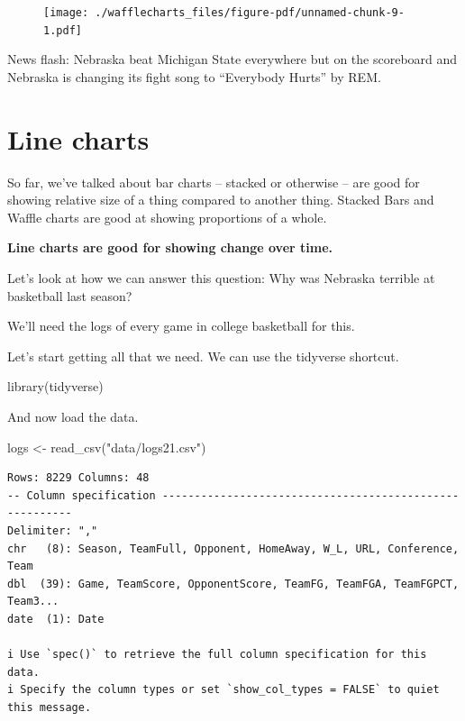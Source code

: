 \documentclass[
  letterpaper,
  DIV=11,
  numbers=noendperiod]{scrreprt}
\newenvironment{Shaded}{\begin{snugshade}}{\end{snugshade}}
\newcommand{\FunctionTok}[1]{\textcolor[rgb]{0.28,0.35,0.67}{#1}}
\newcommand{\NormalTok}[1]{\textcolor[rgb]{0.00,0.23,0.31}{#1}}
\newcommand{\OtherTok}[1]{\textcolor[rgb]{0.00,0.23,0.31}{#1}}
\newcommand{\StringTok}[1]{\textcolor[rgb]{0.13,0.47,0.30}{#1}}
\begin{document}
\begin{figure}[H]

{\centering \texttt{[image: ./wafflecharts\_files/figure-pdf/unnamed-chunk-9-1.pdf]}

}

\end{figure}

News flash: Nebraska beat Michigan State everywhere but on the
scoreboard and Nebraska is changing its fight song to ``Everybody
Hurts'' by REM.


\hypertarget{line-charts}{%
\chapter{Line charts}\label{line-charts}}

So far, we've talked about bar charts -- stacked or otherwise -- are
good for showing relative size of a thing compared to another thing.
Stacked Bars and Waffle charts are good at showing proportions of a
whole.

\textbf{Line charts are good for showing change over time.}

Let's look at how we can answer this question: Why was Nebraska terrible
at basketball last season?

We'll need the logs of every game in college basketball for this.

Let's start getting all that we need. We can use the tidyverse shortcut.

\begin{Shaded}
\begin{Highlighting}[]
\FunctionTok{library}\NormalTok{(tidyverse)}
\end{Highlighting}
\end{Shaded}

And now load the data.

\begin{Shaded}
\begin{Highlighting}[]
\NormalTok{logs }\OtherTok{\textless{}{-}} \FunctionTok{read\_csv}\NormalTok{(}\StringTok{"data/logs21.csv"}\NormalTok{)}
\end{Highlighting}
\end{Shaded}

\begin{verbatim}
Rows: 8229 Columns: 48
-- Column specification --------------------------------------------------------
Delimiter: ","
chr   (8): Season, TeamFull, Opponent, HomeAway, W_L, URL, Conference, Team
dbl  (39): Game, TeamScore, OpponentScore, TeamFG, TeamFGA, TeamFGPCT, Team3...
date  (1): Date

i Use `spec()` to retrieve the full column specification for this data.
i Specify the column types or set `show_col_types = FALSE` to quiet this message.
\end{verbatim}
\end{document}
